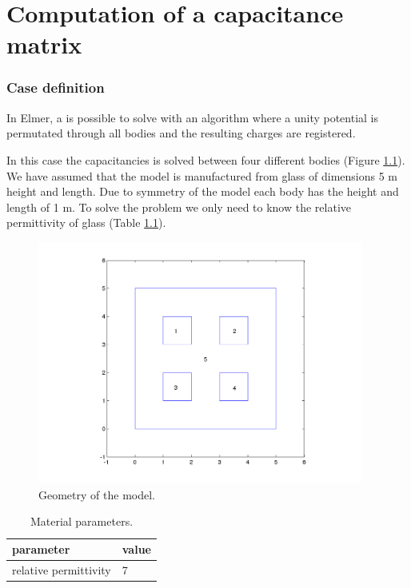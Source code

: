 \chapter{Computation of a capacitance matrix}



\subsection*{Case definition}

\begin{flushleft}

In Elmer, a  is possible to solve with an algorithm where a unity potential is permutated through 
all bodies and the resulting charges are registered. 

In this case the capacitancies is solved between four different bodies (Figure \ref{fg:4holegeometry}). We have assumed that the model is manufactured from glass of dimensions 5 m height and length. Due to symmetry of the model each body has the height and length of 1 m. To solve the problem we only need to know the relative permittivity of glass (Table \ref{tb:glasspar}).

\begin{figure}[h]
\centering
\includegraphics[height=80mm]{4holegeometry}
\caption{Geometry of the model.}\label{fg:4holegeometry}
\end{figure}


\begin{table}[h]
\caption{Material parameters.}
\label{tb:glasspar}
\begin{center}
\begin{tabular}{ll} \hline
parameter  & value \\ \hline
relative permittivity & 7      \\ \hline
\end{tabular}
\end{center}
\end{table} 


\end{flushleft}

